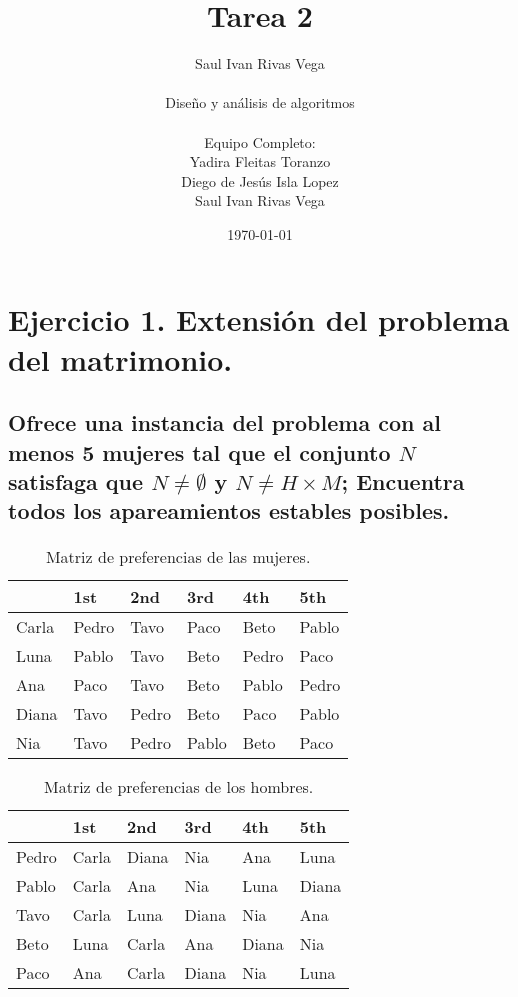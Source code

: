 \documentclass[12pt]{article}
\title{Tarea 2}
\author{
	Saul Ivan Rivas Vega \\
	\\
	Diseño y análisis de algoritmos\\
\\
	Equipo Completo:\\
		Yadira Fleitas Toranzo\\
		Diego de Jesús Isla Lopez\\
		Saul Ivan Rivas Vega\\
}
\date{\today}
\begin{document}
	\maketitle
	\pagebreak
	\section{Ejercicio 1. Extensión del problema del matrimonio.}
	\subsection{Ofrece una instancia del problema con al menos 5 mujeres tal que el conjunto $N$ satisfaga que $N\neq\emptyset$ y $N\neq H\times M$; Encuentra todos los apareamientos estables posibles.}
	 \paragraph{}
	 \begin{table}[h!]
	 	\begin{center}
	 		\label{tab:wedding_problem_W}
	 		\begin{tabular}{C{2cm} ||C{2cm} |C{2cm} |C{2cm} |C{2cm} |C{2cm} |}
	 			\textbf{} & \textbf{1st} & \textbf{2nd} & \textbf{3rd}  & \textbf{4th} & \textbf{5th}\\
	 			\hline
	 			Carla & Pedro & Tavo & Paco & Beto & Pablo\\
	 			\hline
	 			Luna & Pablo & Tavo & Beto & Pedro & Paco\\
	 			\hline
	 			Ana & Paco & Tavo & Beto & Pablo & Pedro\\
	 			\hline
	 			 Diana& Tavo & Pedro & Beto & Paco & Pablo\\
	 			 \hline
	 			 Nia & Tavo & Pedro & Pablo & Beto & Paco\\
	 		\end{tabular}
	 		\caption{Matriz de preferencias de las mujeres.}
	 	\end{center}
	 \end{table}
  \begin{table}[h!]
 	\begin{center}
 		\label{tab:wedding_problem_M}
 		\begin{tabular}{C{2cm} ||C{2cm} |C{2cm} |C{2cm} |C{2cm} |C{2cm} |}
 			\textbf{} & \textbf{1st} & \textbf{2nd} & \textbf{3rd}  & \textbf{4th} & \textbf{5th}\\
 			\hline
 			Pedro & Carla & Diana & Nia & Ana & Luna\\
 			\hline
 			Pablo & Carla & Ana & Nia & Luna & Diana\\
 			\hline
 			Tavo & Carla & Luna & Diana & Nia & Ana\\
 			\hline
 			Beto& Luna & Carla & Ana & Diana & Nia\\
 			\hline
 			Paco & Ana & Carla & Diana & Nia & Luna\\
 		\end{tabular}
 		\caption{Matriz de preferencias de los hombres.}
 	\end{center}
 \end{table}
\end{document}
